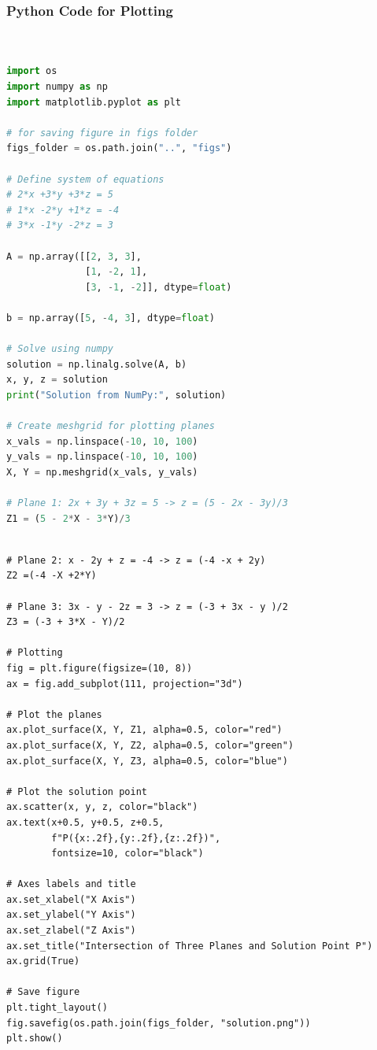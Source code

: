 \documentclass{beamer}
\numberwithin{equation}{section}
\theoremstyle{remark}
\begin{document}
\begin{frame}[fragile]
\frametitle{Python Code for Plotting}
\begin{lstlisting}[language=Python]


import os
import numpy as np
import matplotlib.pyplot as plt

# for saving figure in figs folder
figs_folder = os.path.join("..", "figs")

# Define system of equations
# 2*x +3*y +3*z = 5
# 1*x -2*y +1*z = -4
# 3*x -1*y -2*z = 3

A = np.array([[2, 3, 3],
              [1, -2, 1],
              [3, -1, -2]], dtype=float)

b = np.array([5, -4, 3], dtype=float)

# Solve using numpy
solution = np.linalg.solve(A, b)
x, y, z = solution
print("Solution from NumPy:", solution)

# Create meshgrid for plotting planes
x_vals = np.linspace(-10, 10, 100)
y_vals = np.linspace(-10, 10, 100)
X, Y = np.meshgrid(x_vals, y_vals)

# Plane 1: 2x + 3y + 3z = 5 -> z = (5 - 2x - 3y)/3
Z1 = (5 - 2*X - 3*Y)/3
\end{lstlisting}
\end{frame}
\begin{frame}[fragile]
\begin{lstlisting}

# Plane 2: x - 2y + z = -4 -> z = (-4 -x + 2y)
Z2 =(-4 -X +2*Y)

# Plane 3: 3x - y - 2z = 3 -> z = (-3 + 3x - y )/2
Z3 = (-3 + 3*X - Y)/2

# Plotting
fig = plt.figure(figsize=(10, 8))
ax = fig.add_subplot(111, projection="3d")

# Plot the planes
ax.plot_surface(X, Y, Z1, alpha=0.5, color="red")
ax.plot_surface(X, Y, Z2, alpha=0.5, color="green")
ax.plot_surface(X, Y, Z3, alpha=0.5, color="blue")

# Plot the solution point
ax.scatter(x, y, z, color="black")
ax.text(x+0.5, y+0.5, z+0.5,
        f"P({x:.2f},{y:.2f},{z:.2f})",
        fontsize=10, color="black")

# Axes labels and title
ax.set_xlabel("X Axis")
ax.set_ylabel("Y Axis")
ax.set_zlabel("Z Axis")
ax.set_title("Intersection of Three Planes and Solution Point P")
ax.grid(True)

# Save figure
plt.tight_layout()
fig.savefig(os.path.join(figs_folder, "solution.png"))
plt.show()


\end{lstlisting}
\end{frame}
\end{document}
